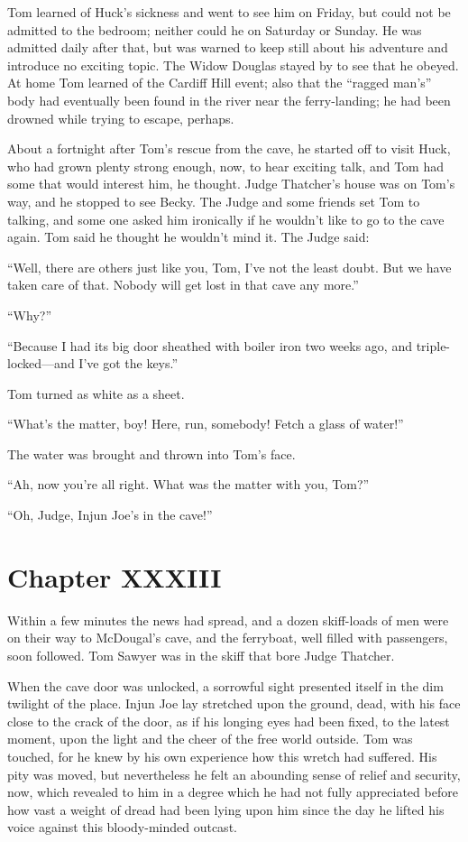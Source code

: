 \documentclass{book}
\begin{document}
Tom learned of Huck’s sickness and went to see him on Friday, but could not be admitted to the bedroom; neither could he on Saturday or Sunday. He was admitted daily after that, but was warned to keep still about his adventure and introduce no exciting topic. The Widow Douglas stayed by to see that he obeyed. At home Tom learned of the Cardiff Hill event; also that the “ragged man’s” body had eventually been found in the river near the ferry-landing; he had been drowned while trying to escape, perhaps.

About a fortnight after Tom’s rescue from the cave, he started off to visit Huck, who had grown plenty strong enough, now, to hear exciting talk, and Tom had some that would interest him, he thought. Judge Thatcher’s house was on Tom’s way, and he stopped to see Becky. The Judge and some friends set Tom to talking, and some one asked him ironically if he wouldn’t like to go to the cave again. Tom said he thought he wouldn’t mind it. The Judge said:

“Well, there are others just like you, Tom, I’ve not the least doubt. But we have taken care of that. Nobody will get lost in that cave any more.”

“Why?”

“Because I had its big door sheathed with boiler iron two weeks ago, and triple-locked—and I’ve got the keys.”

Tom turned as white as a sheet.

“What’s the matter, boy! Here, run, somebody! Fetch a glass of water!”

The water was brought and thrown into Tom’s face.

“Ah, now you’re all right. What was the matter with you, Tom?”

“Oh, Judge, Injun Joe’s in the cave!”

\chapter*{Chapter XXXIII}

Within a few minutes the news had spread, and a dozen skiff-loads of men were on their way to McDougal’s cave, and the ferryboat, well filled with passengers, soon followed. Tom Sawyer was in the skiff that bore Judge Thatcher.

When the cave door was unlocked, a sorrowful sight presented itself in the dim twilight of the place. Injun Joe lay stretched upon the ground, dead, with his face close to the crack of the door, as if his longing eyes had been fixed, to the latest moment, upon the light and the cheer of the free world outside. Tom was touched, for he knew by his own experience how this wretch had suffered. His pity was moved, but nevertheless he felt an abounding sense of relief and security, now, which revealed to him in a degree which he had not fully appreciated before how vast a weight of dread had been lying upon him since the day he lifted his voice against this bloody-minded outcast.
\end{document}
